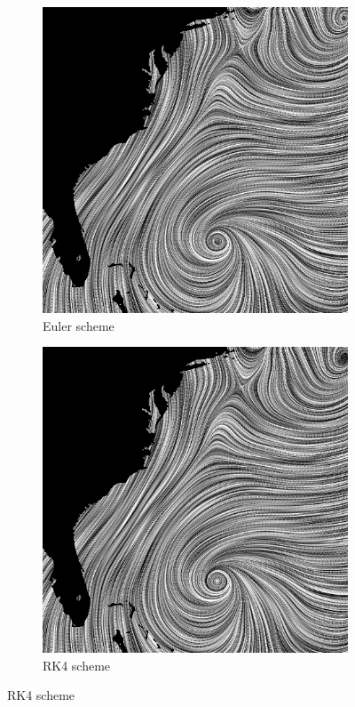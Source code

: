 \documentclass{article}
\begin{document}
\begin{figure}[h!]
    \centering
    \begin{subfigure}{0.48\textwidth}
        \centering
        \includegraphics[width=\textwidth]{isabel_euler.png}
        \caption{Euler scheme}
    \end{subfigure}
    \hfill
    \begin{subfigure}{0.48\textwidth}
        \centering
        \includegraphics[width=\textwidth]{isabel_rk4.png}
        \caption{RK4 scheme}
    \end{subfigure}
\end{figure}
\end{document}
